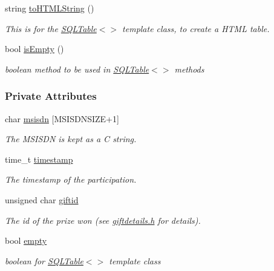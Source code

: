 \begin{CompactItemize}
string \hyperlink{classpartDetails_partDetailsa13}{to\-HTMLString} ()
\begin{CompactList}\small\item\em This is for the \hyperlink{classSQLTable}{SQLTable}$<$$>$ template class, to create a HTML table.\item\end{CompactList}\item 
bool \hyperlink{classpartDetails_partDetailsa14}{is\-Empty} ()
\begin{CompactList}\small\item\em boolean method to be used in \hyperlink{classSQLTable}{SQLTable}$<$$>$ methods\item\end{CompactList}\end{CompactItemize}
\subsubsection*{Private Attributes}
\begin{CompactItemize}
\item 
char \hyperlink{classpartDetails_partDetailso0}{msisdn} \mbox{[}MSISDNSIZE+1\mbox{]}
\begin{CompactList}\small\item\em The MSISDN is kept as a C string.\item\end{CompactList}\item 
time\_\-t \hyperlink{classpartDetails_partDetailso1}{timestamp}
\begin{CompactList}\small\item\em The timestamp of the participation.\item\end{CompactList}\item 
unsigned char \hyperlink{classpartDetails_partDetailso2}{giftid}
\begin{CompactList}\small\item\em The id of the prize won (see \hyperlink{giftdetails_8h}{giftdetails.h} for details).\item\end{CompactList}\item 
bool \hyperlink{classpartDetails_partDetailso3}{empty}
\begin{CompactList}\small\item\em boolean for \hyperlink{classSQLTable}{SQLTable}$<$$>$ template class\item\end{CompactList}\end{CompactItemize}
